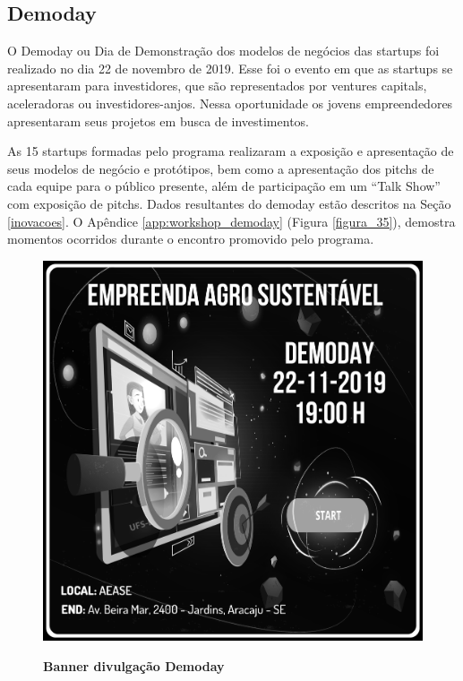 \subsection{Demoday}

O Demoday ou Dia de Demonstração dos modelos de negócios das startups foi realizado no dia 22 de novembro de 2019. Esse foi o evento em que as startups se apresentaram para investidores, que são representados por ventures capitals, aceleradoras ou investidores-anjos. Nessa oportunidade os jovens empreendedores apresentaram seus projetos em busca de investimentos.

As 15 startups formadas pelo programa realizaram a exposição e apresentação de seus modelos de negócio e protótipos, bem como a apresentação dos pitchs de cada equipe para o público presente, além de participação em um “Talk Show” com exposição de pitchs. Dados resultantes do demoday estão descritos na Seção \ref{inovacoes}. 
O Apêndice \ref{app:workshop_demoday} (Figura \ref{figura_35}), demostra momentos ocorridos durante o encontro promovido pelo programa.



\begin{figure}[H]
\centering
\caption{\textbf{Banner divulgação Demoday}}
\includegraphics[scale=0.1]{Imagens/demoday_banner.png}
\label{fig:ods}
\end{figure}


